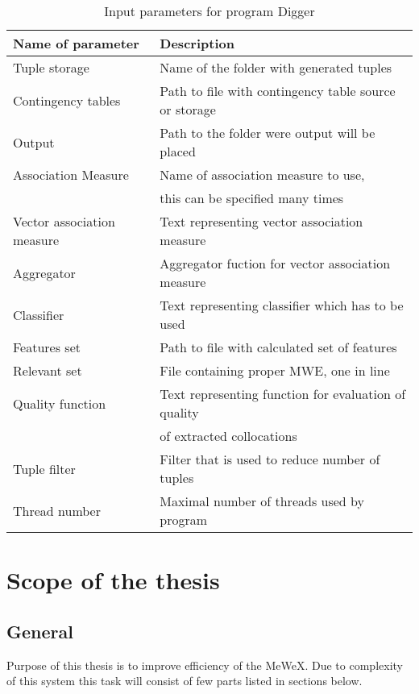 \begin{table}[t]
    \centering
    \begin{tabular*}{\textwidth}{|l @{\extracolsep{\fill}} l|}
        \hline 
        \textbf{Name of parameter} & \textbf{Description} \\
        \hline
        Tuple storage & Name of the folder with generated tuples \\
        \hline
        Contingency tables & Path to file with contingency table source or storage \\
        \hline
        Output & Path to the folder were output will be placed \\
        \hline
        Association Measure & Name of association measure to use, \\& this can be specified many times \\
        \hline
        Vector association measure & Text representing vector association measure \\
        \hline
        Aggregator & Aggregator fuction for vector association measure \\
        \hline
        Classifier & Text representing classifier which has to be used \\
        \hline
        Features set & Path to file with calculated set of features \\
        \hline
        Relevant set & File containing proper MWE, one in line \\
        \hline
        Quality function & Text representing function for evaluation of quality \\& of extracted collocations \\
        \hline
        Tuple filter & Filter that is used to reduce number of tuples \\
        \hline
        Thread number & Maximal number of threads used by program \\
        \hline
    \end{tabular*} 
    \caption{Input parameters for program Digger}
    \label{tbl_workflow2}
\end{table}

\section{Scope of the thesis}

\subsection{General}
Purpose of this thesis is to improve efficiency of the MeWeX. Due to complexity of this system this task 
will consist of few parts listed in sections below.

